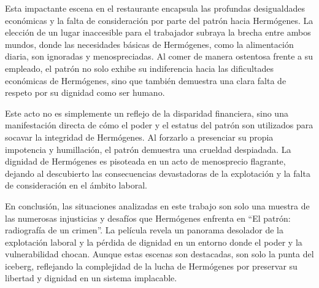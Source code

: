 \documentclass[letterpaper, 12pt]{article}
\begin{document}
Esta impactante escena en el restaurante encapsula las
profundas desigualdades económicas y la falta de
consideración por parte del patrón hacia Hermógenes. La
elección de un lugar inaccesible para el trabajador subraya
la brecha entre ambos mundos, donde las necesidades básicas
de Hermógenes, como la alimentación diaria, son ignoradas y
menospreciadas. Al comer de manera ostentosa frente a su
empleado, el patrón no solo exhibe su indiferencia hacia
las dificultades económicas de Hermógenes, sino que también
demuestra una clara falta de respeto por su dignidad como
ser humano.

Este acto no es simplemente un reflejo de la disparidad
financiera, sino una manifestación directa de cómo el poder
y el estatus del patrón son utilizados para socavar la
integridad de Hermógenes. Al forzarlo a presenciar su
propia impotencia y humillación, el patrón demuestra una
crueldad despiadada. La dignidad de Hermógenes es pisoteada
en un acto de menosprecio flagrante, dejando al descubierto
las consecuencias devastadoras de la explotación y la falta
de consideración en el ámbito laboral.

En conclusión, las situaciones analizadas en este trabajo
son solo una muestra de las numerosas injusticias y
desafíos que Hermógenes enfrenta en ``El patrón: radiografía
de un crimen''. La película revela un panorama desolador de
la explotación laboral y la pérdida de dignidad en un
entorno donde el poder y la vulnerabilidad chocan. Aunque
estas escenas son destacadas, son solo la punta del
iceberg, reflejando la complejidad de la lucha de
Hermógenes por preservar su libertad y dignidad en un
sistema implacable.

\newpage

\printbibliography
\end{document}
